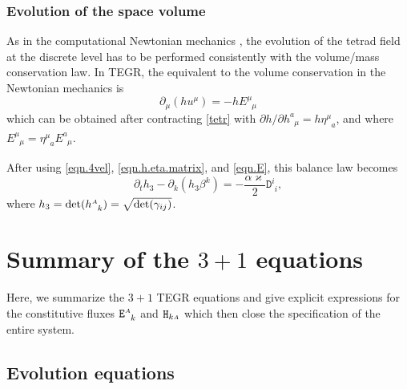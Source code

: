 \documentclass[
10pt, %
a4paper, %
oneside, %
headinclude,footinclude, %
BCOR5mm, %
]{scrartcl}
\newcommand{\sA}{\mathsmaller A}
\newcommand{\pd}[1]{\partial_{#1}}
\newcommand{\tetrsymbol}{h}
\newcommand{\itetrsymbol}{\eta}
\newcommand{\itetr}[2]{\itetrsymbol^{#1}_{\phantom{#1}#2}}
\newcommand{\tetr}[2]{\tetrsymbol^{#1}_{\phantom{#1}#2}}
\newcommand{\detTetr}{\tetrsymbol}
\newcommand{\ET}[2]{E^{#1}_{\phantom{#1}#2}}	%
\newcommand{\Dfin}[2]{\mathtt{D}_{\phantom{#2}#1}^{#2}}	%
\newcommand{\Hfin}[2]{\mathtt{H}_{#2#1}}	%
\newcommand{\Efin}[2]{\mathtt{E}^{#1}_{\phantom{#1}#2}}	%
\newcommand{\shift}[1]{\beta^{#1}}
\begin{document}
\subsubsection{Evolution of the space volume}

As in the computational Newtonian mechanics \cite{DPRZ2016,SIGPR2021}, the evolution of the tetrad 
field at the discrete level has to be performed consistently with the volume/mass conservation law. 
In 
TEGR, the equivalent to the volume conservation in the Newtonian mechanics is 
\begin{equation}\label{eqn.pde.det}
	\pd{\mu}(\detTetr u^\mu) = -\detTetr \ET{\mu}{\mu} 
\end{equation} 
which can be obtained after contracting \eqref{tetr} with $ \partial \detTetr/\partial 
\tetr{a}{\mu} 
= \detTetr
\itetr{\mu}{a} $, and where $ \ET{\mu}{\mu} = \itetr{\mu}{a} \ET{a}{\mu}$.


After using \eqref{eqn.4vel}, \eqref{eqn.h.eta.matrix}, and \eqref{eqn.E}, this balance law becomes
\begin{equation}\label{eqn.h.PDE}
	\pd{t}\detTetr_3 - \pd{k}(\detTetr_3\shift{k} ) =-\frac{\alpha \varkappa}{2} \Dfin{i}{i},
\end{equation}
where $ \detTetr_3 =\det(\tetr{\sA}{k}) = \sqrt{\det(\gamma_{ij})} $.




\section{Summary of the $ 3+1 $ equations}
Here, we summarize the $ 3+1 $ TEGR equations and give explicit expressions for the constitutive 
fluxes $ \Efin{\sA}{k} $ and
$ \Hfin{\sA}{k} $ which then close the specification of the entire system.


\subsection{Evolution equations}
\end{document}

